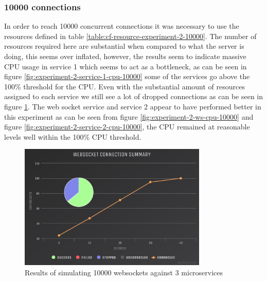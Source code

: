 \subsubsection{10000 connections}

In order to reach 10000 concurrent connections it was necessary to use the resources defined in table \ref{table:cf-resource-experiment-2-10000}. The number of resources required here are substantial when compared to what the server is doing, this seems over inflated, however, the results seem to indicate massive CPU usage in service 1 which seems to act as a bottleneck, as can be seen in figure \ref{fig:experiment-2-service-1-cpu-10000} some of the services go above the 100\% threshold for the CPU. Even with the substantial amount of resources assigned to each service we still see a lot of dropped connections as can be seen in figure \ref{fig:experiment-2-conn-10000}. The web socket service and service 2 appear to have performed better in this experiment as can be seen from figure \ref{fig:experiment-2-ws-cpu-10000} and figure \ref{fig:experiment-2-service-2-cpu-10000}, the CPU remained at reasonable levels well within the 100\% CPU threshold.

\begin{table}[H]
\caption{Resources allocated to each service}
\label{table:cf-resource-experiment-2-10000}
\end{table}

\begin{figure}[H]
  \centering
    \includegraphics[width=0.8\textwidth]{figures/experiments/experiment-2/10000/conn-10000.png}
    \caption{Results of simulating 10000 websockets against 3 microservices}
    \label{fig:experiment-2-conn-10000}
\end{figure}

